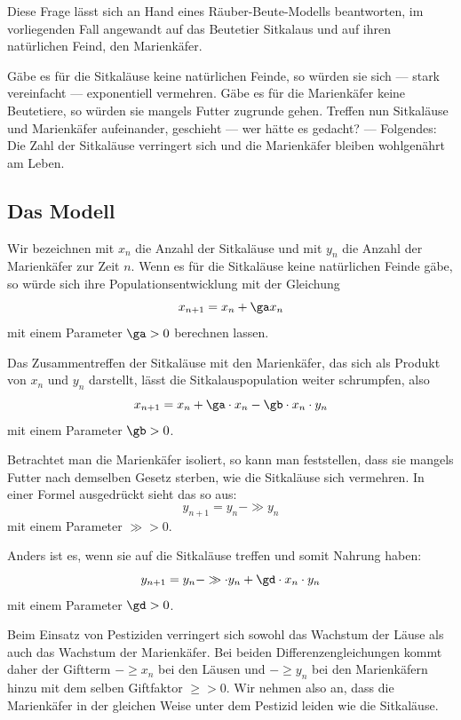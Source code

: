 \documentclass[%
<<<<<<< Updated upstream
11pt,%
twoside,%
titlepage,%
german,%
headsepline%
]{scrartcl}
\begin{document}
Diese Frage lässt sich an Hand eines Räuber-Beute-Modells beantworten, im vorliegenden Fall angewandt auf das Beutetier Sitkalaus und auf ihren natürlichen Feind, den Marienkäfer.

Gäbe es für die Sitkaläuse keine natürlichen Feinde, so würden sie sich --- stark vereinfacht --- exponentiell vermehren. Gäbe es für die Marienkäfer keine Beutetiere, so würden sie mangels Futter zugrunde gehen. Treffen nun Sitkaläuse und Marienkäfer aufeinander, geschieht --- wer hätte es gedacht? --- Folgendes: Die Zahl der Sitkaläuse verringert sich und die Marienkäfer bleiben wohlgenährt am Leben.

\subsection{Das Modell}
Wir bezeichnen mit $x_n$ die Anzahl der Sitkaläuse und mit $y_n$ die Anzahl der Marienkäfer zur Zeit $n$.
Wenn es für die Sitkaläuse keine natürlichen Feinde gäbe, so würde sich ihre Populationsentwicklung mit der Gleichung
$$x_{n+1}=x_n+\ga x_n$$
mit einem Parameter $\ga > 0$ berechnen lassen.

Das Zusammentreffen der Sitkaläuse mit den Marienkäfer, das sich als Produkt von $x_n$ und $y_n$ darstellt, lässt die Sitkalauspopulation weiter schrumpfen, also
$$x_{n+1}=x_n+\ga\cdot x_n-\gb\cdot x_n\cdot y_n$$
mit einem Parameter $\gb > 0$.

Betrachtet man die Marienkäfer isoliert, so kann man feststellen, dass sie mangels Futter nach demselben Gesetz sterben, wie die Sitkaläuse sich vermehren. In einer Formel ausgedrückt sieht das so aus:
$$y_{n+1}=y_n-\gg y_n$$
mit einem Parameter $\gg > 0$.

Anders ist es, wenn sie auf die Sitkaläuse treffen und somit Nahrung haben:
$$y_{n+1}=y_n-\gg\cdot y_n+\gd\cdot x_n\cdot y_n$$
mit einem Parameter $\gd> 0$.

Beim Einsatz von Pestiziden verringert sich sowohl das Wachstum der Läuse als auch das Wachstum der Marienkäfer. Bei beiden Differenzengleichungen kommt daher der Giftterm $-\ge x_n$ bei den Läusen und $-\ge y_n$ bei den Marienkäfern hinzu mit dem selben Giftfaktor $\ge > 0$. Wir nehmen also an, dass die Marienkäfer in der gleichen Weise unter dem Pestizid leiden wie die Sitkaläuse.
\end{document}
